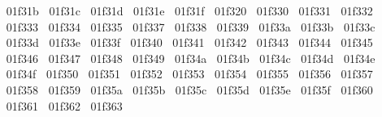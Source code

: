 {  ^^^^^^01f31b%
  ^^^^^^01f31c%
  ^^^^^^01f31d%
  ^^^^^^01f31e%
  ^^^^^^01f31f%
  ^^^^^^01f320%
  ^^^^^^01f330%
  ^^^^^^01f331%
  ^^^^^^01f332%
  ^^^^^^01f333%
  ^^^^^^01f334%
  ^^^^^^01f335%
  ^^^^^^01f337%
  ^^^^^^01f338%
  ^^^^^^01f339%
  ^^^^^^01f33a%
  ^^^^^^01f33b%
  ^^^^^^01f33c%
  ^^^^^^01f33d%
  ^^^^^^01f33e%
  ^^^^^^01f33f%
  ^^^^^^01f340%
  ^^^^^^01f341%
  ^^^^^^01f342%
  ^^^^^^01f343%
  ^^^^^^01f344%
  ^^^^^^01f345%
  ^^^^^^01f346%
  ^^^^^^01f347%
  ^^^^^^01f348%
  ^^^^^^01f349%
  ^^^^^^01f34a%
  ^^^^^^01f34b%
  ^^^^^^01f34c%
  ^^^^^^01f34d%
  ^^^^^^01f34e%
  ^^^^^^01f34f%
  ^^^^^^01f350%
  ^^^^^^01f351%
  ^^^^^^01f352%
  ^^^^^^01f353%
  ^^^^^^01f354%
  ^^^^^^01f355%
  ^^^^^^01f356%
  ^^^^^^01f357%
  ^^^^^^01f358%
  ^^^^^^01f359%
  ^^^^^^01f35a%
  ^^^^^^01f35b%
  ^^^^^^01f35c%
  ^^^^^^01f35d%
  ^^^^^^01f35e%
  ^^^^^^01f35f%
  ^^^^^^01f360%
  ^^^^^^01f361%
  ^^^^^^01f362%
  ^^^^^^01f363%
}
